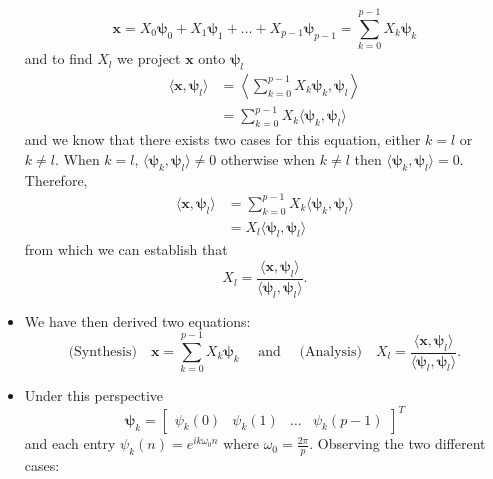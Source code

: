 \begin{itemize}
	      \begin{equation*}
		      \bm{x}  = X_0\bm{\psi}_{0} + X_1\bm{\psi}_{1} + \ldots +X_{p-1}\bm{\psi}_{p-1}
		      = \sum_{k=0}^{p-1} X_{k}\bm{\psi}_{k}
	      \end{equation*}
	      and to find $X_{l}$ we project $\bm{x}$ onto $\bm{\psi}_{l}$
	      \begin{align*}
		      \langle \bm{x}, \bm{\psi}_{l} \rangle & = \left\langle \sum_{k=0}^{p-1} X_{k}\bm{\psi}_{k}, \bm{\psi}_{l} \right\rangle \\
		                                            & = \sum_{k=0}^{p-1} X_{k} \langle \bm{\psi}_{k}, \bm{\psi}_{l} \rangle
	      \end{align*}
	      and we know that there exists two cases for this equation, either $k=l$ or $k\neq l$.
	      When $k=l$, $\langle \bm{\psi}_{k}, \bm{\psi}_{l} \rangle \neq 0$ otherwise when
	      $k\neq l$ then $\langle \bm{\psi}_{k}, \bm{\psi}_{l} \rangle = 0$. Therefore,
	      \begin{align*}
		      \langle \bm{x}, \bm{\psi}_{l} \rangle & = \sum_{k=0}^{p-1} X_{k} \langle \bm{\psi}_{k}, \bm{\psi}_{l} \rangle \\
		                                            & = X_{l} \langle \bm{\psi}_{l}, \bm{\psi}_{l} \rangle
	      \end{align*}
	      from which we can establish that
	      \[
		      X_{l} = \frac{\langle \bm{x}, \bm{\psi}_{l} \rangle}{\langle \bm{\psi}_{l}, \bm{\psi}_{l} \rangle}
		      .\]
	\item We have then derived two equations:
	      \begin{equation}
		      \text{(Synthesis)}\hspace{1em} \bm{x} = \sum_{k=0}^{p-1} X_{k}\bm{\psi}_{k}
		      \quad \text{ and } \quad
		      \text{(Analysis)}\hspace{1em} X_{l} = \frac{\langle \bm{x}, \bm{\psi}_{l} \rangle}{\langle \bm{\psi}_{l}, \bm{\psi}_{l} \rangle}
		      .\end{equation}
	\item Under this perspective
	      \[
		      \bm{\psi}_{k} =
		      \begin{bmatrix}
			      \psi_{k}(0) & \psi_{k}(1) & \ldots & \psi_{k}(p-1)
		      \end{bmatrix}^T
	      \]
	      and each entry $\psi_{k}(n) = e^{ik\omega_{0}n}$ where $\omega_{0} = \frac{2\pi}{p}$.
	      Observing the two different cases:
	      \begin{enumerate}

\end{enumerate}
\end{itemize}
